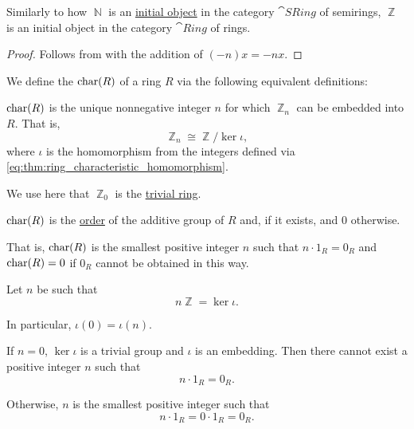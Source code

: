 \begin{proposition}\label{thm:ring_characteristic_homomorphism}
  Similarly to how \( \BbbN \) is an \hyperref[def:universal_objects/initial]{initial object} in the category \hyperref[def:semiring/category]{\( \cat{SRing} \)} of semirings, \( \BbbZ \) is an initial object in the category \hyperref[def:ring/category]{\( \cat{Ring} \)} of rings.
\end{proposition}
\begin{proof}
  Follows from  with the addition of \( (-n)x = -nx \).
\end{proof}

\begin{definition}\label{def:ring_characteristic}\mimprovised
  We define the  \( \operatorname{char}(R) \) of a ring \( R \) via the following equivalent definitions:
  \begin{thmenum}
     \( \operatorname{char}(R) \) is the unique nonnegative integer \( n \) for which \( \BbbZ_n \) can be embedded into \( R \). That is,
    \begin{equation*}
      \BbbZ_n \cong \BbbZ / \ker \iota,
    \end{equation*}
    where \( \iota \) is the homomorphism from the integers defined via \eqref{eq:thm:ring_characteristic_homomorphism}.

    We use here that \( \BbbZ_0 \) is the \hyperref[def:ring/trivial]{trivial ring}.

     \( \operatorname{char}(R) \) is the \hyperref[def:group_order]{order} of the additive group of \( R \) and, if it exists, and \( 0 \) otherwise.

    That is, \( \operatorname{char}(R) \) is the smallest positive integer \( n \) such that \( n \cdot 1_R = 0_R \) and \( \operatorname{char}(R) = 0 \) if \( 0_R \) cannot be obtained in this way.
  \end{thmenum}
\end{definition}
\begin{defproof}
   Let \( n \) be such that
  \begin{equation*}
    n \BbbZ = \ker\iota.
  \end{equation*}

  In particular, \( \iota(0) = \iota(n) \).

  If \( n = 0 \), \( \ker\iota \) is a trivial group and \( \iota \) is an embedding. Then there cannot exist a positive integer \( n \) such that
  \begin{equation*}
    n \cdot 1_R = 0_R.
  \end{equation*}

  Otherwise, \( n \) is the smallest positive integer such that
  \begin{equation*}
    n \cdot 1_R = 0 \cdot 1_R = 0_R.
  \end{equation*}
\end{defproof}

